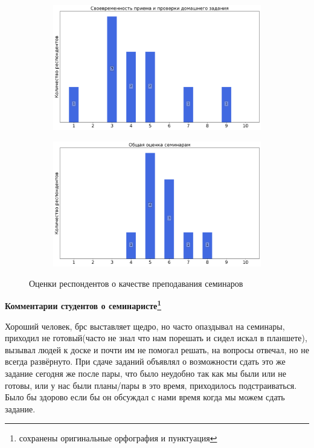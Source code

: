 \begin{figure}[H]
\begin{subfigure}[b]{0.45\textwidth}
                \includegraphics[width=\textwidth]{images/3 course/ТФКП/seminarists-marks-Киреенков А.А.-2.png}
            \end{subfigure}
            \begin{subfigure}[b]{0.45\textwidth}
                \centering
                \includegraphics[width=\textwidth]{images/3 course/ТФКП/seminarists-marks-Киреенков А.А.-3.png}
            \end{subfigure}	
            \caption{Оценки респондентов о качестве преподавания семинаров}
        \end{figure}

        \textbf{Комментарии студентов о семинаристе\protect\footnote{сохранены оригинальные орфография и пунктуация}}
            \begin{commentbox} 
                Хороший человек, брс выставляет щедро, но часто опаздывал на семинары, приходил не готовый(часто не знал что нам порешать и сидел искал в планшете), вызывал людей к доске и почти им не помогал решать, на вопросы отвечал, но не всегда развёрнуто. При сдаче заданий объявлял о возможности сдать это же задание сегодня же после пары, что было неудобно так как мы были или не готовы, или у нас были планы/пары в это время, приходилось подстраиваться. Было бы здорово если бы он обсуждал с нами время когда мы можем сдать задание. 
            \end{commentbox} 
        
